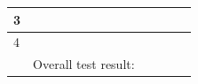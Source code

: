 \begin{table}[]
\begin{tabular}{|llllllllll|}
		\multicolumn{1}{|l|}{3}                     & \multicolumn{3}{l|}{}                                 & \multicolumn{2}{l|}{}                                  & \multicolumn{1}{l|}{}                                                                       & \multicolumn{1}{l|}{}                                                                       & \multicolumn{1}{l|}{}                     &                           \\ \hline
		\multicolumn{1}{|l|}{4}                     & \multicolumn{3}{l|}{}                                 & \multicolumn{2}{l|}{}                                  & \multicolumn{1}{l|}{}                                                                       & \multicolumn{1}{l|}{}                                                                       & \multicolumn{1}{l|}{}                     &                           \\ \hline
		\multicolumn{1}{|l|}{}                      & \multicolumn{5}{l|}{Overall test result:}                                                                      & \multicolumn{1}{l|}{}                                                                       & \multicolumn{1}{l|}{}                                                                       & \multicolumn{1}{l|}{}                     &                           \\ \hline
	\end{tabular}
\end{table}
